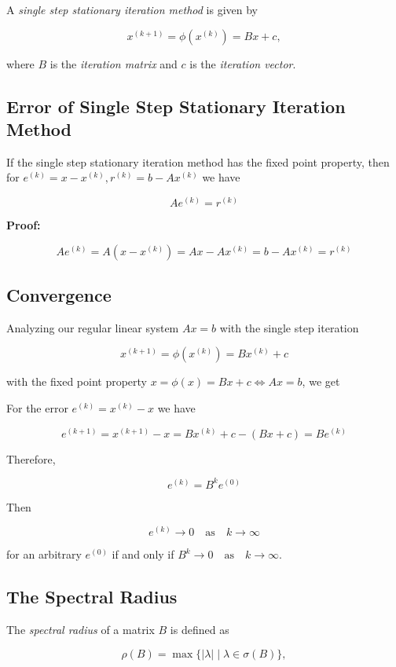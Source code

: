 A \emph{single step stationary iteration method} is given by 

\[
    x^{(k + 1)} = \phi(x^{(k)}) = Bx + c,
\]

where \(B\) is the \emph{iteration matrix} and \(c\) is the \emph{iteration vector}.

\subsection{Error of Single Step Stationary Iteration Method}

If the single step stationary iteration method has the fixed point property, then for 
\(e^{(k)} = x - x^{(k)}, r^{(k)} = b - Ax^{(k)}\) we have

\[
    Ae^{(k)} = r^{(k)}
\]

\textbf{Proof:}

\[
    Ae^{(k)} = A(x - x^{(k)}) = Ax - Ax^{(k)} = b - Ax^{(k)} = r^{(k)}
\]

\QED

\subsection{Convergence}

Analyzing our regular linear system \(Ax = b\) with the single step iteration 

\[
    x^{(k + 1)} = \phi(x^{(k)}) = Bx^{(k)} + c
\]

with the fixed point property \(x = \phi(x) = Bx + c \iff Ax = b\), we get

For the error \(e^{(k)} = x^{(k)} - x\) we have 

\[
    e^{(k + 1)} = x^{(k + 1)} - x = Bx^{(k)} + c - (Bx + c) = Be^{(k)}
\]

Therefore, 

\[
    e^{(k)} = B^k e^{(0)}
\]

Then 

\[
    e^{(k)} \to 0 \quad \text{as} \quad k \to \infty
\]

for an arbitrary \(e^{(0)}\) if and only if \(B^k \to 0 \quad \text{as} \quad k \to \infty\).

\subsection{The Spectral Radius}

The \emph{spectral radius} of a matrix \(B\) is defined as
 
\[
    \rho(B) = \max\{|\lambda| \mid \lambda \in \sigma(B)\},
\]

